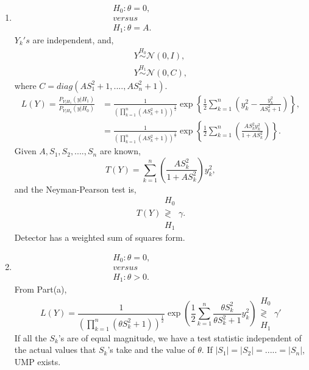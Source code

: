 \documentclass[a4paper,english,12pt]{article}
\begin{document}
\begin{enumerate}[label=(\alph*).]
\item \begin{gather*}
H_0: \theta=0,\\
versus\hspace{100pt}\\
H_1: \theta=A.
\end{gather*}
$Y_k's$ are independent, and,
\begin{gather*}
Y\overset{H_0}{\sim} \mathcal{N}(0,I),\\
Y\overset{H_1}{\sim} \mathcal{N}(0,C),
\end{gather*}
where $C=diag(AS_1^2+1,....,AS_n^2+1)$.
\begin{align*}
L(Y)=\frac{P_{{Y}|{H_1}}\left({y}|{H_1}\right)}{P_{{Y}|{H_0}}\left({y}|{H_0}\right)}&=\frac{1}{\left(\prod\limits_{k=1}
^{n}(AS_k^2+1)\right)^\frac{1}{2}}\exp\left\{\frac{1}{2}\sum\limits_{k=1}^n\left(y_k^2-\frac{y_k^2}{AS_k^2+1}\right)\right\},\\
&=\frac{1}{\left(\prod\limits_{k=1}
^{n}(AS_k^2+1)\right)^\frac{1}{2}}\exp\left\{\frac{1}{2}\sum\limits_{k=1}^n\left(\frac{AS_k^2y_k^2}{1+AS_k^2}\right) \right\}.
\end{align*}
Given $A,S_1,S_2,....,S_n$ are known,
\begin{equation*}
T(Y)=\sum\limits_{k=1}^n\left(\frac{AS_k^2}{1+AS_k^2}\right)y_k^2,
\end{equation*}
and the Neyman-Pearson test is,
\begin{equation*}
T(Y) \substack{H_0\\\gtrless\\ H_1} \gamma.
\end{equation*}
Detector has a weighted sum of squares form.
\item 
\begin{gather*}
H_0: \theta=0,\\
versus\hspace{100pt}\\
H_1: \theta>0.
\end{gather*}
From Part(a),
\begin{equation*}
L(Y)=\frac{1}{\left(\prod\limits_{k=1}
^{n}(\theta S_k^2+1)\right)^\frac{1}{2}}\exp\left(\frac{1}{2}\sum\limits_{k=1}^n\frac{\theta S_k^2}{\theta S_k^2+1}y_k^2\right)\substack{H_0\\\gtrless\\ H_1}\gamma'
\end{equation*}
If all the $S_k$'s are of equal magnitude, we have a test statistic independent of the actual values that $S_k$'s take and the value of $\theta$. If $|S_1|=|S_2|=.....=|S_n|$, UMP exists.

\end{enumerate}
\end{document}
